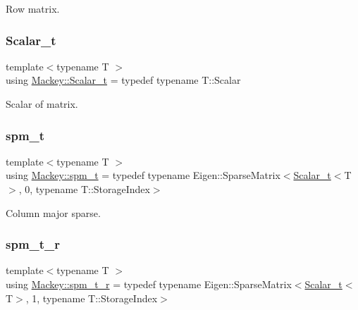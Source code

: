 Row matrix. 

\mbox{\label{namespaceMackey_a93ba297573961f91101fb84bc84bbe95}} 
\subsubsection{\texorpdfstring{Scalar\+\_\+t}{Scalar\_t}}
{\footnotesize\ttfamily template$<$typename T $>$ \\
using \hyperlink{namespaceMackey_a93ba297573961f91101fb84bc84bbe95}{Mackey\+::\+Scalar\+\_\+t} = typedef typename T\+::\+Scalar}



Scalar of matrix. 

\mbox{\label{namespaceMackey_a3f5deb1be99876ac8c7d72f0f0cca3af}} 
\subsubsection{\texorpdfstring{spm\+\_\+t}{spm\_t}}
{\footnotesize\ttfamily template$<$typename T $>$ \\
using \hyperlink{namespaceMackey_a3f5deb1be99876ac8c7d72f0f0cca3af}{Mackey\+::spm\+\_\+t} = typedef typename Eigen\+::\+Sparse\+Matrix$<$\hyperlink{namespaceMackey_a93ba297573961f91101fb84bc84bbe95}{Scalar\+\_\+t}$<$T$>$, 0, typename T\+::\+Storage\+Index$>$}



Column major sparse. 

\mbox{\label{namespaceMackey_acc7de57bf31af7089e6bc392c8b52e7e}} 
\subsubsection{\texorpdfstring{spm\+\_\+t\+\_\+r}{spm\_t\_r}}
{\footnotesize\ttfamily template$<$typename T $>$ \\
using \hyperlink{namespaceMackey_acc7de57bf31af7089e6bc392c8b52e7e}{Mackey\+::spm\+\_\+t\+\_\+r} = typedef typename Eigen\+::\+Sparse\+Matrix$<$\hyperlink{namespaceMackey_a93ba297573961f91101fb84bc84bbe95}{Scalar\+\_\+t}$<$T$>$, 1, typename T\+::\+Storage\+Index$>$}



